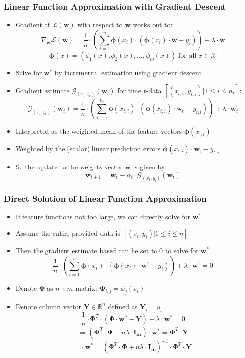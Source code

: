 \documentclass[handout]{beamer}
\begin{document}
\begin{frame}
\frametitle{Linear Function Approximation with Gradient Descent}
\pause
\begin{itemize}[<+->]
\item Gradient of $\mathcal{L}(\bm{w})$ with respect to $\bm{w}$ works out to:
$$\nabla_{\bm{w}} \mathcal{L}(\bm{w}) = \frac 1 n \cdot (\sum_{i=1}^n \bm{\phi}(x_i) \cdot (\bm{\phi}(x_i) \cdot \bm{w} - y_i)) + \lambda \cdot \bm{w}$$
$$\bm{\phi}(x) = (\phi_1(x), \phi_2(x), \ldots, \phi_m(x)) \text{ for all } x \in \mathcal{X}$$
\item Solve for $\bm{w^*}$ by incremental estimation using gradient descent
\item Gradient estimate $\mathcal{G}_{(x_t,y_t)}(\bm{w}_t)$ for time $t$-data $[(x_{t,i}, y_{t,i})|1 \leq i \leq n_t]$:
$$\mathcal{G}_{(x_t, y_t)}(\bm{w}_t) = \frac 1 n \cdot (\sum_{i=1}^{n_t} \bm{\phi}(x_{t,i}) \cdot (\bm{\phi}(x_{t,i}) \cdot \bm{w}_t - y_{t,i})) + \lambda \cdot \bm{w}_t$$
\item Interpreted as the weighted-mean of the feature vectors $\bm{\phi}(x_{t,i})$
\item Weighted by the (scalar) linear prediction errors $\bm{\phi}(x_{t,i}) \cdot \bm{w}_t - y_{t,i}$
\item So the update to the weights vector $\bm{w}$ is given by:
$$\bm{w}_{t+1} = \bm{w}_t - \alpha_t \cdot \mathcal{G}_{(x_t, y_t)}(\bm{w}_t)$$
\end{itemize}
\end{frame}

\begin{frame}
\frametitle{Direct Solution of Linear Function Approximation}
\pause
\begin{itemize}[<+->]
\item If feature functions not too large, we can directly solve for $\bm{w^*}$ 
\item Assume the entire provided data is $[(x_i, y_i)|1\leq i \leq n]$
\item Then the gradient estimate based can be set to 0 to solve for $\bm{w^*}$
$$\frac 1 n \cdot (\sum_{i=1}^n \bm{\phi}(x_i) \cdot (\bm{\phi}(x_i) \cdot \bm{w^*} - y_i)) + \lambda \cdot \bm{w^*} = 0$$
\item Denote $\bm{\Phi}$ as $n \times m$ matrix: $\bm{\Phi}_{i,j} = \phi_j(x_i)$
\item Denote column vector $\bm{Y} \in \mathbb{R}^n$ defined as $\bm{Y}_i = y_i$
$$\frac 1 n \cdot \bm{\Phi}^T \cdot (\bm{\Phi} \cdot \bm{w^*} - \bm{Y}) + \lambda \cdot \bm{w^*} = 0$$
$$\Rightarrow (\bm{\Phi}^T \cdot \bm{\Phi} + n \lambda \cdot \bm{I_m}) \cdot \bm{w^*} = \bm{\Phi}^T \cdot \bm{Y}$$
$$\Rightarrow \bm{w^*} = (\bm{\Phi}^T \cdot \bm{\Phi} + n \lambda \cdot \bm{I_m})^{-1} \cdot \bm{\Phi}^T \cdot \bm{Y}$$
\end{itemize}
\end{frame}
\end{document}

